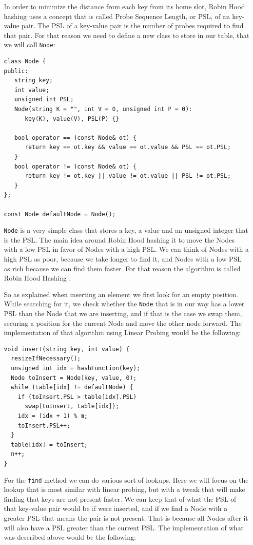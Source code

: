 In order to minimize the distance from each key from its home slot, Robin Hood hashing uses a concept that is called Probe Sequence Length, or PSL, of an key-value pair. The PSL of a key-value pair is the number of probes required to find that pair. For that reason we need to define a new class to store in our table, that we will call \texttt{Node}:

\begin{lstlisting}
class Node {
public:
   string key;
   int value;
   unsigned int PSL;   
   Node(string K = "", int V = 0, unsigned int P = 0):
      key(K), value(V), PSL(P) {}

   bool operator == (const Node& ot) {
      return key == ot.key && value == ot.value && PSL == ot.PSL;
   }
   bool operator != (const Node& ot) {
      return key != ot.key || value != ot.value || PSL != ot.PSL;
   }
};

const Node defaultNode = Node();
\end{lstlisting}

\texttt{Node} is a very simple class that stores a key, a value and an unsigned integer that is the PSL. The main idea around Robin Hood hashing it to move the Nodes with a low PSL in favor of Nodes with a high PSL. We can think of Nodes with a high PSL as poor, because we take longer to find it, and Nodes with a low PSL as rich because we can find them faster. For that reason the algorithm is called Robin Hood Hashing \citep{RobinHoodHashing}.

So as explained when inserting an element we first look for an empty position. While searching for it, we check whether the \texttt{Node} that is in our way has a lower PSL than the Node that we are inserting, and if that is the case we swap them, securing a position for the current Node and move the other node forward. The implementation of that algorithm using Linear Probing would be the following:

\begin{lstlisting}
void insert(string key, int value) {
  resizeIfNecessary();
  unsigned int idx = hashFunction(key);
  Node toInsert = Node(key, value, 0);
  while (table[idx] != defaultNode) {
    if (toInsert.PSL > table[idx].PSL)
      swap(toInsert, table[idx]);         
    idx = (idx + 1) % m;
    toInsert.PSL++;
  }
  table[idx] = toInsert;
  n++;
}
\end{lstlisting}

For the \texttt{find} method we can do various sort of lookups. Here we will focus on the lookup that is most similar with linear probing, but with a tweak that will make finding that keys are not present faster. We can keep that of what the PSL of that key-value pair would be if were inserted, and if we find a Node with a greater PSL that means the pair is not present. That is because all Nodes after it will also have a PSL greater than the current PSL. The implementation of what was described above would be the following:

